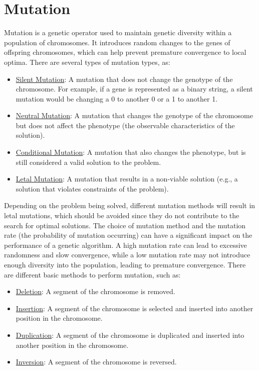 \section{Mutation}
Mutation is a genetic operator used to maintain genetic diversity within a population of chromosomes. It introduces random changes to the genes of offspring chromosomes, which can help prevent premature convergence to local optima. There are several types of mutation types, as:
\begin{itemize}
    \item \ul{Silent Mutation}: A mutation that does not change the genotype of the chromosome. For example, if a gene is represented as a binary string, a silent mutation would be changing a 0 to another 0 or a 1 to another 1.
    \item \ul{Neutral Mutation}: A mutation that changes the genotype of the chromosome but does not affect the phenotype (the observable characteristics of the solution).
    \item \ul{Conditional Mutation}: A mutation that also changes the phenotype, but is still considered a valid solution to the problem.
    \item \ul{Letal Mutation}: A mutation that results in a non-viable solution (e.g., a solution that violates constraints of the problem).
\end{itemize}

Depending on the problem being solved, different mutation methods will result in letal mutations, which should be avoided since they do not contribute to the search for optimal solutions. The choice of mutation method and the mutation rate (the probability of mutation occurring) can have a significant impact on the performance of a genetic algorithm. A high mutation rate can lead to excessive randomness and slow convergence, while a low mutation rate may not introduce enough diversity into the population, leading to premature convergence. There are different basic methods to perform mutation, such as:
\begin{itemize}
    \item \ul{Deletion}: A segment of the chromosome is removed.
    \item \ul{Insertion}: A segment of the chromosome is selected and inserted into another position in the chromosome.
    \item \ul{Duplication}: A segment of the chromosome is duplicated and inserted into another position in the chromosome.
    \item \ul{Inversion}: A segment of the chromosome is reversed.
\end{itemize}

